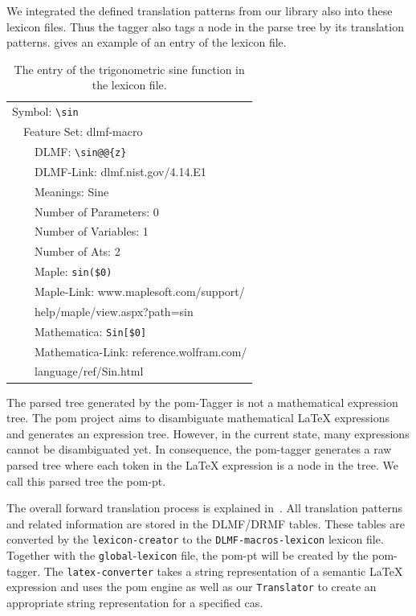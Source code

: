 \documentclass[a4paper,11pt]{article}
\theoremstyle{defTheoStyle}
\theoremstyle{defExampStyle}
\begin{document}
We integrated the defined translation patterns from our library also into these lexicon files. Thus the tagger also tags a node in the parse tree by its translation patterns.  gives an example of an entry of the lexicon file.

\begin{table}[ht!]
	\centering
	\begin{tabular}{lll}
	\hline
	\multicolumn{3}{l}{Symbol: \texttt{\textbackslash sin}} \\
	\! & \multicolumn{2}{l}{Feature Set: dlmf-macro} \\
	\! & \! & DLMF: \verb|\sin@@{z}|\\
	\! & \! & DLMF-Link: dlmf.nist.gov/4.14.E1\\
	\! & \! & Meanings: Sine\\
	\! & \! & Number of Parameters: 0\\
	\! & \! & Number of Variables: 1\\
	\! & \! & Number of Ats: 2\\
	\! & \! & Maple: \verb|sin($0)|\\
	\! & \! & Maple-Link: www.maplesoft.com/support/\\
	\! & \! & \hspace{32pt} help/maple/view.aspx?path=sin\\
	\! & \! & Mathematica: \verb|Sin[$0]|\\
	\! & \! & Mathematica-Link: reference.wolfram.com/\\
	\! & \! & \hspace{32pt} language/ref/Sin.html\\
	\hline
	\end{tabular}
	\caption{The entry of the trigonometric sine function in the lexicon file.}
	\label{tab:sine-lex-example}
\end{table}

The parsed tree generated by the \gls*{pom}-Tagger is not a mathematical expression tree. The \gls*{pom} project aims to disambiguate mathematical \LaTeX{} expressions and generates an expression tree. However, in the current state, many expressions cannot be disambiguated yet. In consequence, the \gls*{pom}-tagger generates a raw parsed tree where each token in the \LaTeX{} expression is a node in the tree. We call this parsed tree the \gls*{pom-pt}.

{\sloppy The overall forward translation process is explained in~. All translation patterns and related information are stored in the DLMF/DRMF tables. These tables are converted by the \verb|lexicon-creator| to the \verb|DLMF-macros-lexicon| lexicon file. Together with the \verb|global|-\verb|lexicon| file, the \gls*{pom-pt} will be created by the \gls*{pom}-tagger. The \verb|latex-converter| takes a string representation of a semantic \LaTeX{} expression and uses the \gls*{pom} engine as well as our \verb|Translator| to create an appropriate string representation for a specified \gls*{cas}.}
\end{document}
